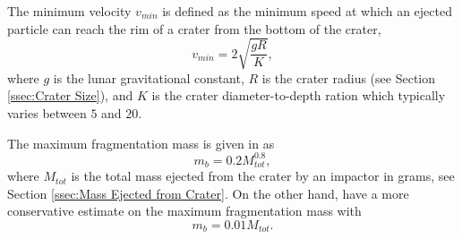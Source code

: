 \documentclass{article}
\begin{document}
The minimum velocity $v_{min}$ is defined as the minimum speed at which an ejected particle can reach the rim of a crater from the bottom of the crater,
\begin{equation}
v_{min} = 2\sqrt{\frac{gR}{K}},
\end{equation}
where $g$ is the lunar gravitational constant, $R$ is the crater radius (see Section \ref{ssec:Crater Size}), and $K$ is the crater diameter-to-depth ration which typically varies between $5$ and $20$. 

The maximum fragmentation mass is given in \cite{oKeefe1985impact} as
\begin{equation}
m_b = 0.2 M_{tot}^{0.8},
\end{equation}
where $M_{tot}$ is the total mass ejected from the crater by an impactor in grams, see Section \ref{ssec:Mass Ejected from Crater}. On the other hand, \cite{koschny2001impacts_mass} have a more conservative estimate on the maximum fragmentation mass with
\begin{equation}
m_b = 0.01 M_{tot}.
\end{equation}


\end{document}
